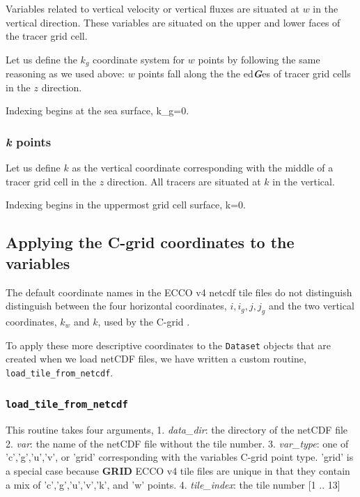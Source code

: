 \documentclass[11pt]{article}
\begin{document}
Variables related to vertical velocity or vertical fluxes are situated
at \(w\) in the vertical direction. These variables are situated on the
upper and lower faces of the tracer grid cell.

Let us define the \(k_g\) coordinate system for \(w\) points by
following the same reasoning as we used above: \(w\) points fall along
the the ed\textbf{\emph{G}}es of tracer grid cells in the \(z\)
direction.

Indexing begins at the sea surface, k\_g=0.

\subsubsection{\texorpdfstring{\emph{k}
points}{k points}}\label{k-points}

Let us define \(k\) as the vertical coordinate corresponding with the
middle of a tracer grid cell in the \(z\) direction. All tracers are
situated at \(k\) in the vertical.

Indexing begins in the uppermost grid cell surface, k=0.

\subsection{Applying the C-grid coordinates to the
variables}\label{applying-the-c-grid-coordinates-to-the-variables}

The default coordinate names in the ECCO v4 netcdf tile files do not
distinguish distinguish between the four horizontal coordinates,
\(i, i_g, j, j_g\) and the two vertical coordinates, \(k_w\) and \(k\),
used by the C-grid .

To apply these more descriptive coordinates to the \texttt{Dataset}
objects that are created when we load netCDF files, we have written a
custom routine, \texttt{load\_tile\_from\_netcdf}.

\subsubsection{\texorpdfstring{\texttt{load\_tile\_from\_netcdf}}{load\_tile\_from\_netcdf}}\label{load_tile_from_netcdf}

This routine takes four arguments, 1. \emph{data\_dir}: the directory of
the netCDF file 2. \emph{var}: the name of the netCDF file without the
tile number. 3. \emph{var\_type}: one of 'c','g','u','v', or 'grid'
corresponding with the variables C-grid point type. 'grid' is a special
case because \textbf{GRID} ECCO v4 tile files are unique in that they
contain a mix of 'c','g','u','v','k', and 'w' points. 4.
\emph{tile\_index}: the tile number {[}1 .. 13{]}
\end{document}
